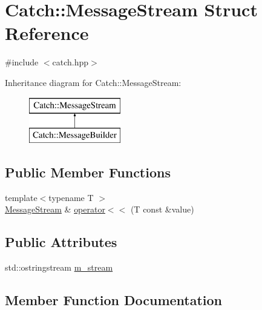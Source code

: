 \hypertarget{structCatch_1_1MessageStream}{}\section{Catch\+:\+:Message\+Stream Struct Reference}
\label{structCatch_1_1MessageStream}


{\ttfamily \#include $<$catch.\+hpp$>$}

Inheritance diagram for Catch\+:\+:Message\+Stream\+:\begin{figure}[H]
\begin{center}
\leavevmode
\includegraphics[height=2.000000cm]{structCatch_1_1MessageStream}
\end{center}
\end{figure}
\subsection*{Public Member Functions}
\begin{DoxyCompactItemize}
\item 
{\footnotesize template$<$typename T $>$ }\\\mbox{\hyperlink{structCatch_1_1MessageStream}{Message\+Stream}} \& \mbox{\hyperlink{structCatch_1_1MessageStream_a554c4aff5925a077e9fe9d858217428d}{operator$<$$<$}} (T const \&value)
\end{DoxyCompactItemize}
\subsection*{Public Attributes}
\begin{DoxyCompactItemize}
\item 
std\+::ostringstream \mbox{\hyperlink{structCatch_1_1MessageStream_a0fc1529663b32a29f3232d96d8b50188}{m\+\_\+stream}}
\end{DoxyCompactItemize}


\subsection{Member Function Documentation}
\mbox{\label{structCatch_1_1MessageStream_a554c4aff5925a077e9fe9d858217428d}} 
